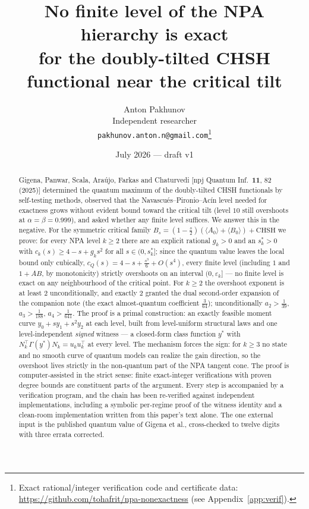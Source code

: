 \documentclass[11pt]{article}
\title{No finite level of the NPA hierarchy is exact\\ for the doubly-tilted CHSH functional near the critical tilt}
\author{Anton Pakhunov\\ \small Independent researcher\\ \small \texttt{pakhunov.anton.n@gmail.com}\thanks{Exact rational/integer verification code and certificate data: \url{https://github.com/tohafrit/npa-nonexactness} (see Appendix~\ref{app:verif}).}}
\date{July 2026 --- draft v1}
\newcommand{\la}{\langle}
\newcommand{\ra}{\rangle}
\newcommand{\eps}{\varepsilon}
\begin{document}
\maketitle

\begin{abstract}
Gigena, Panwar, Scala, Ara\'ujo, Farkas and Chaturvedi [npj Quantum Inf.\
\textbf{11}, 82 (2025)] determined the quantum maximum of the doubly-tilted
CHSH functionals by self-testing methods, observed that the
Navascu\'es--Pironio--Ac\'in level needed for exactness grows without evident
bound toward the critical tilt (level $10$ still overshoots at
$\alpha=\beta=0.999$), and asked whether any finite level suffices. We answer
this in the negative. For the symmetric critical family
$B_s=(1-\tfrac s2)(\la A_0\ra+\la B_0\ra)+\mathrm{CHSH}$ we prove: for every
NPA level $k\ge2$ there are an explicit rational $g_k>0$ and an
$s^\ast_k>0$ with $c_k(s)\ge 4-s+g_k s^2$ for all $s\in(0,s^\ast_k]$; since
the quantum value leaves the local bound only cubically,
$c_Q(s)=4-s+\tfrac{s^3}6+O(s^4)$, every finite level (including $1$ and
$1{+}AB$, by monotonicity) strictly overshoots on an interval $(0,\eps_k]$
--- no finite level is exact on any neighbourhood of the critical point. For
$k\ge2$ the overshoot exponent is at least $2$ unconditionally, and exactly
$2$ granted the dual second-order expansion of the companion note (the exact
almost-quantum coefficient $\tfrac3{64}$); unconditionally $a_2>\tfrac1{39}$,
$a_3>\tfrac1{188}$, $a_4>\tfrac1{641}$. The proof is a primal construction:
an exactly feasible moment curve $y_0+sy_1+s^2y_2$ at each level, built from
level-uniform structural laws and one level-independent \emph{signed}
witness --- a closed-form class function $y^\ast$ with
$N_k^\top\Gamma(y^\ast)N_k=u_ku_k^\top$ at every level. The mechanism forces
the sign: for $k\ge3$ no state and no smooth curve of quantum models can
realize the gain direction, so the overshoot lives
strictly in the non-quantum part of the NPA tangent cone. The proof is
computer-assisted in the strict sense: finite exact-integer verifications
with proven degree bounds are constituent parts of the argument. Every step
is accompanied by a verification program, and the chain has been re-verified
against independent implementations, including a symbolic per-regime proof
of the witness identity and a clean-room implementation written from this
paper's text alone. The one external input is the published
quantum value of Gigena et al., cross-checked to twelve digits with three
errata corrected.
\end{abstract}
\end{document}
